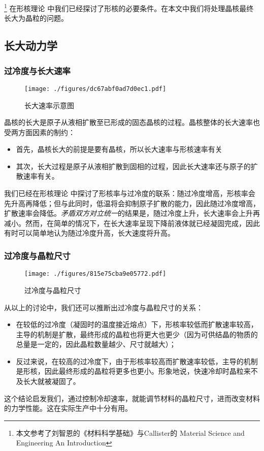 
\footnote{本文参考了刘智恩的《材料科学基础》与Callister的 Material Science and Engineering An Introduction} 在形核理论  中我们已经探讨了形核的必要条件。在本文中我们将处理晶核最终长大为晶粒的问题。

\subsection{长大动力学}
\subsubsection{过冷度与长大速率}
\begin{figure}[ht]
\centering
\texttt{[image: ./figures/dc67abf0ad7d0ec1.pdf]}
\caption{长大速率示意图} \label{fig_GGRW_1}
\end{figure}

晶核的长大是原子从液相扩散至已形成的固态晶核的过程。晶核整体的长大速率也受两方面因素的制约：
\begin{itemize}
\item 首先，晶核长大的前提是要有晶核，所以长大速率与形核速率有关
\item 其次，长大过程是原子从液相扩散到固相的过程，因此长大速率还与原子的扩散速率有关。
\end{itemize}

我们已经在形核理论  中探讨了形核率与过冷度的联系：随过冷度增高，形核率会先升高再降低；但与此同时，低温将会抑制原子扩散的能力，因此随过冷度增高，扩散速率会降低。\textsl{矛盾双方对立统一}的结果是，随过冷度上升，长大速率会上升再减小。然而，在简单的情况下，在长大速率呈现下降前液体就已经凝固完成，因此有时可以简单地认为随过冷度升高，长大速度将升高。

\subsubsection{过冷度与晶粒尺寸}
\begin{figure}[ht]
\centering
\texttt{[image: ./figures/815e75cba9e05772.pdf]}
\caption{过冷度与晶粒尺寸} \label{fig_GGRW_fig2}
\end{figure}
从以上的讨论中，我们还可以推断出过冷度与晶粒尺寸的关系：
\begin{itemize}
\item 在较低的过冷度（凝固时的温度接近熔点）下，形核率较低而扩散速率较高，主导的机制是扩散，最终形成的晶粒也将更大也更少（因为可供结晶的物质的总量是一定的，因此晶粒数量越少、尺寸就越大）；
\item 反过来说，在较高的过冷度下，由于形核率较高而扩散速率较低，主导的机制是形核，因此最终形成的晶粒将更多也更小。形象地说，快速冷却时晶粒来不及长大就被凝固了。
\end{itemize}
这个结论启发我们，通过控制冷却速率，就能调节材料的晶粒尺寸，进而改变材料的力学性能。这在实际生产中十分有用。

